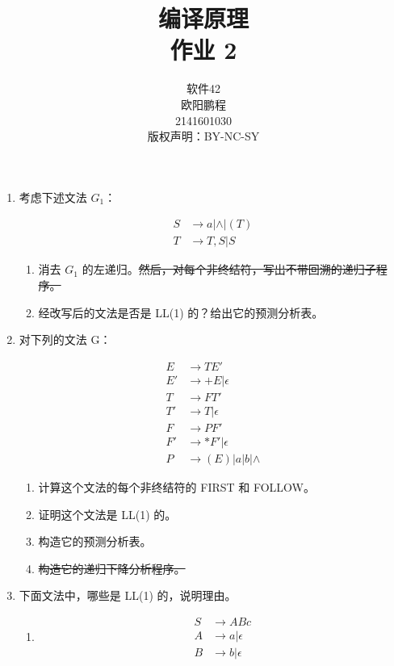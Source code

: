 \documentclass[]{ctexart}
\title{编译原理 \\ 作业 2}
\author{软件42 \\ 欧阳鹏程 \\ 2141601030 \\ 版权声明：BY-NC-SY}
\begin{document}
\maketitle

\begin{enumerate}
	\item 考虑下述文法 $G_1$：
	
	\begin{align*}
	S & \to a | \wedge | (T) \\
	T & \to T,S | S
	\end{align*}
	
	\begin{enumerate}
		\item 消去 $G_1$ 的左递归。\sout{然后，对每个非终结符，写出不带回溯的递归子程序。}
		\item 经改写后的文法是否是 LL(1) 的？给出它的预测分析表。
		
	\end{enumerate}
	\newpage
	
	\item 对下列的文法 G：
	
	\begin{align*}
	E & \to TE' \\
	E' & \to +E | \epsilon \\
	T & \to FT' \\
	T' & \to T | \epsilon \\
	F & \to PF' \\
	F' & \to *F' | \epsilon \\
	P & \to (E) | a | b | \wedge
	\end{align*}
	
	\begin{enumerate}
		\item 计算这个文法的每个非终结符的 FIRST 和 FOLLOW。
		\item 证明这个文法是 LL(1) 的。
		\item 构造它的预测分析表。
		\item \sout{构造它的递归下降分析程序。}
	\end{enumerate}
	\newpage
	
	\null
	\newpage
	
	\item 下面文法中，哪些是 LL(1) 的，说明理由。
	
	\begin{enumerate}
		\item \begin{align*}
		S & \to ABc \\
		A & \to a | \epsilon \\
		B & \to b | \epsilon
		\end{align*}
		

\end{enumerate}
\end{enumerate}
\end{document}
